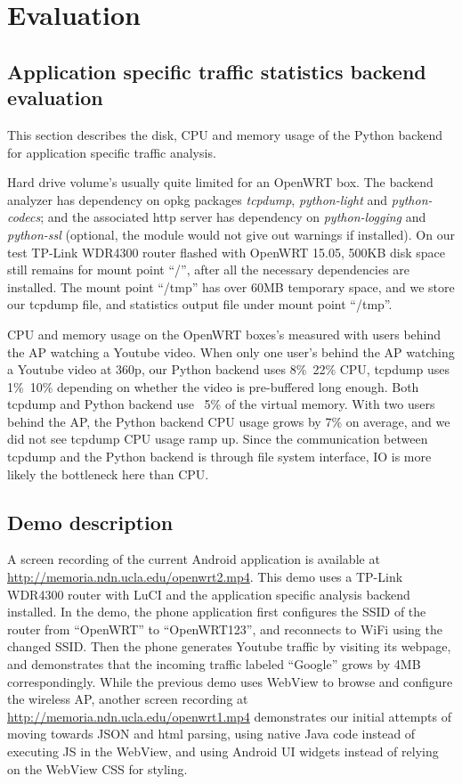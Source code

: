 \section{Evaluation}


\subsection{Application specific traffic statistics backend evaluation}

This section describes the disk, CPU and memory usage of the Python backend for application specific traffic analysis. 

Hard drive volume's usually quite limited for an OpenWRT box. The backend analyzer has dependency on opkg packages \textit{tcpdump}, \textit{python-light} and \textit{python-codecs}; and the associated http server has dependency on \textit{python-logging} and \textit{python-ssl} (optional, the module would not give out warnings if installed). On our test TP-Link WDR4300 router flashed with OpenWRT 15.05, 500KB disk space still remains for mount point ``/'', after all the necessary dependencies are installed. The mount point ``/tmp'' has over 60MB temporary space, and we store our tcpdump file, and statistics output file under mount point ``/tmp''.

CPU and memory usage on the OpenWRT boxes's measured with users behind the AP watching a Youtube video. When only one user's behind the AP watching a Youtube video at 360p, our Python backend uses 8\%~22\% CPU, tcpdump uses 1\%~10\% depending on whether the video is pre-buffered long enough. Both tcpdump and Python backend use ~5\% of the virtual memory. With two users behind the AP, the Python backend CPU usage grows by 7\% on average, and we did not see tcpdump CPU usage ramp up. Since the communication between tcpdump and the Python backend is through file system interface, IO is more likely the bottleneck here than CPU.

\subsection{Demo description}

A screen recording of the current Android application is available at \url{http://memoria.ndn.ucla.edu/openwrt2.mp4}. This demo uses a TP-Link WDR4300 router with LuCI and the application specific analysis backend installed. In the demo, the phone application first configures the SSID of the router from ``OpenWRT'' to ``OpenWRT123'', and reconnects to WiFi using the changed SSID. Then the phone generates Youtube traffic by visiting its webpage, and demonstrates that the incoming traffic labeled ``Google'' grows by 4MB correspondingly. While the previous demo uses WebView to browse and configure the wireless AP, another screen recording at \url{http://memoria.ndn.ucla.edu/openwrt1.mp4} demonstrates our initial attempts of moving towards JSON and html parsing, using native Java code instead of executing JS in the WebView, and using Android UI widgets instead of relying on the WebView CSS for styling.